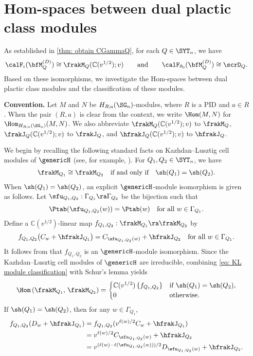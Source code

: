 \documentclass[12pt, reqno]{amsart}
\theoremstyle{plain}
\theoremstyle{definition}
\numberwithin{equation}{section}
\numberwithin{figure}{section}
\numberwithin{table}{section}
\def\C{\mathbb C}
\begin{document}
\section{Hom-spaces between dual plactic class modules}\label{subsec: Hom set Gamma Q and Gamma Qp}
As established in \cref{thm: obtain CGammaQ}, for each $Q \in \SYT_n$, we have
\[
\calF_{\iota}(\bfM^{(D)}_Q) \cong \frakM_Q(\C(v^{1/2});v)
\qquad\text{and}\qquad
\calF_{\theta_0}(\bfM^{(D)}_Q) \cong \scrD_Q.
\]
Based on these isomorphisms, we investigate the Hom-spaces between dual plactic class modules and the classification of these modules. 
\medskip

\noindent
{\bf Convention.} 
Let $M$ and $N$ be $H_{R;a}(\SG_n)$-modules, where $R$ is a PID and $a \in R$. When the pair $(R,a)$ is clear from the context, we write $\Hom(M,N)$ for $\Hom_{H_{R;a}(\SG_n)}(M,N)$. We also abbreviate
$\frakM_Q(\C(v^{1/2});v)$
to $\frakM_Q$, $\frakJ_Q(\C(v^{1/2});v)$  to $\frakJ_Q$, and $\hfrakJ_Q(\C(v^{1/2});v)$  to $\hfrakJ_Q$.
\medskip

We begin by recalling the following standard facts on Kazhdan--Lusztig cell modules of $\genericH$ (see, for example, \cite{79KL, 96GL}).
For $Q_1, Q_2 \in \SYT_n$, we have
\begin{align}\label{eq: KL module classification}
\frakM_{Q_1}
\cong
\frakM_{Q_2} \quad\text{if and only if}\quad \sh(Q_1) = \sh(Q_2).
\end{align}
When $\sh(Q_1)=\sh(Q_2)$, an explicit $\genericH$-module isomorphism is given as follows.
Let $\sfu_{Q_1,Q_2}:\Gamma_{Q_1} \ra \Gamma_{Q_2}$ 
be the bijection such that
\[
\Ptab(\sfu_{Q_1, Q_2}(w))=\Ptab(w)
\quad
\text{for all } w\in\Gamma_{Q_1}.
\]
Define a $\C(v^{1/2})$-linear map 
$f_{Q_1,Q_2}:
\frakM_{Q_1}
\ra
\frakM_{Q_2}$  by
\[
f_{Q_1,Q_2}
\bigl(
C_w+\hfrakJ_{Q_1}
\bigr)
=
C_{\sfu_{Q_1,Q_2}(w)}
+\hfrakJ_{Q_2} \quad\text{for all $w \in \Gamma_{Q_1}$}.
\]
It follows from \cite[Theorem 4.10]{96GL} that $f_{Q_1, Q_2}$ is  an $\genericH$-module isomorphism.
Since the Kazhdan--Lusztig cell modules of $\genericH$ are irreducible, combining \cref{eq: KL module classification} with Schur's lemma yields
\begin{align}\label{eq: generic cell module hom sets} 
\Hom\left(
\frakM_{Q_1}, \, \frakM_{Q_2} 
\right) = \begin{cases} \C(v^{1/2})\,\{f_{Q_1,Q_2}\} & \text{if } \sh(Q_1)=\sh(Q_2),\\ 
0 & \text{otherwise.} 
\end{cases} 
\end{align}
If $\sh(Q_1) = \sh(Q_2)$, then for any $w \in \Gamma_{Q_1}$,
\begin{align*}
f_{Q_1,Q_2}(D_w+\hfrakJ_{Q_1})
&=
f_{Q_1,Q_2}(v^{\ell(w)/2}C_w+\hfrakJ_{Q_1})\\
&=
v^{\ell(w)/2}C_{\sfu_{Q_1,Q_2}(w)}+\hfrakJ_{Q_2}\\
&=
v^{(\ell(w)-\ell(\sfu_{Q_1,Q_2}(w)))/2}
D_{\sfu_{Q_1,Q_2}(w)}
+\hfrakJ_{Q_2}.
\end{align*}
\end{document}
